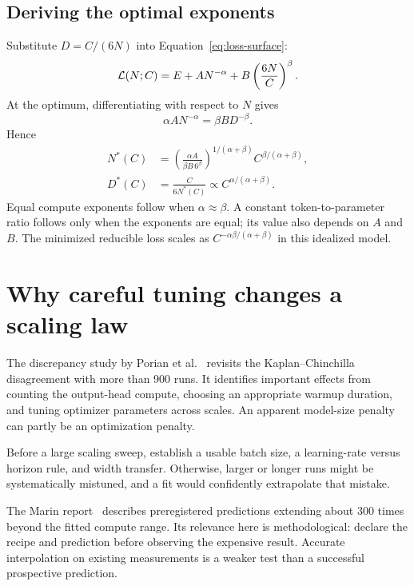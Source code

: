 
\subsection{Deriving the optimal exponents}
Substitute $D=C/(6N)$ into Equation~\eqref{eq:loss-surface}:
\[
\mathcal L(N;C)=E+AN^{-\alpha}+B\left(\frac{6N}{C}\right)^\beta.
\]
At the optimum, differentiating with respect to $N$ gives
\[
\alpha A N^{-\alpha}=\beta B D^{-\beta}.
\]
Hence
\begin{align}
N^*(C)&=\left(\frac{\alpha A}{\beta B\,6^\beta}\right)^{\!1/(\alpha+\beta)}
 C^{\beta/(\alpha+\beta)},\\
D^*(C)&=\frac{C}{6N^*(C)}\propto C^{\alpha/(\alpha+\beta)}.
\label{eq:optimal-exponents}
\end{align}
Equal compute exponents follow when $\alpha\approx\beta$. A constant token-to-parameter ratio follows only when the exponents are equal; its value also depends on $A$ and $B$. The minimized reducible loss scales as $C^{-\alpha\beta/(\alpha+\beta)}$ in this idealized model.

\section{Why careful tuning changes a scaling law}
The discrepancy study by Porian et al.~\cite{discrepancy} revisits the Kaplan--Chinchilla disagreement with more than 900 runs. It identifies important effects from counting the output-head compute, choosing an appropriate warmup duration, and tuning optimizer parameters across scales. An apparent model-size penalty can partly be an optimization penalty.

Before a large scaling sweep, establish a usable batch size, a learning-rate versus horizon rule, and width transfer. Otherwise, larger or longer runs might be systematically mistuned, and a fit would confidently extrapolate that mistake.


The Marin report~\cite{marinscale} describes preregistered predictions extending about 300 times beyond the fitted compute range. Its relevance here is methodological: declare the recipe and prediction before observing the expensive result. Accurate interpolation on existing measurements is a weaker test than a successful prospective prediction.

